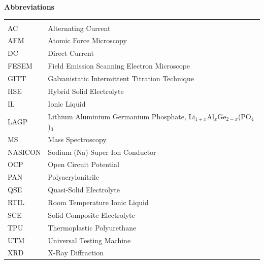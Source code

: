\thispagestyle{plain}
\begin{flushleft}
\textbf{\textbf{\fontsize{22pt}{22pt}\selectfont Abbreviations}}
\end{flushleft}

\begin{longtable}{ll}
\normalsize
\label{tab:abbreviations}\\
AC & Alternating Current \\
AFM & Atomic Force Microscopy \\
DC & Direct Current \\
FESEM & Field Emission Scanning Electron Microscope \\
GITT & Galvanistatic Intermittent Titration Technique \\
HSE & Hybrid Solid Electrolyte \\
IL & Ionic Liquid \\
LAGP & Lithium Aluminium Germanium Phosphate, Li$_{1+x}$Al$_{x}$Ge$_{2-x}$(PO$_{4}$)$_{3}$ \\
MS & Mass Spectroscopy \\
NASICON & Sodium (Na) Super Ion Conductor \\
OCP & Open Circuit Potential \\
PAN & Polyacrylonitrile \\
QSE & Quasi-Solid Electrolyte \\
RTIL & Room Temperature Ionic Liquid \\
SCE & Solid Composite Electrolyte \\
TPU & Thermoplastic Polyurethane \\
UTM & Universal Testing Machine \\
XRD & X-Ray Diffraction
\end{longtable}

\newpage